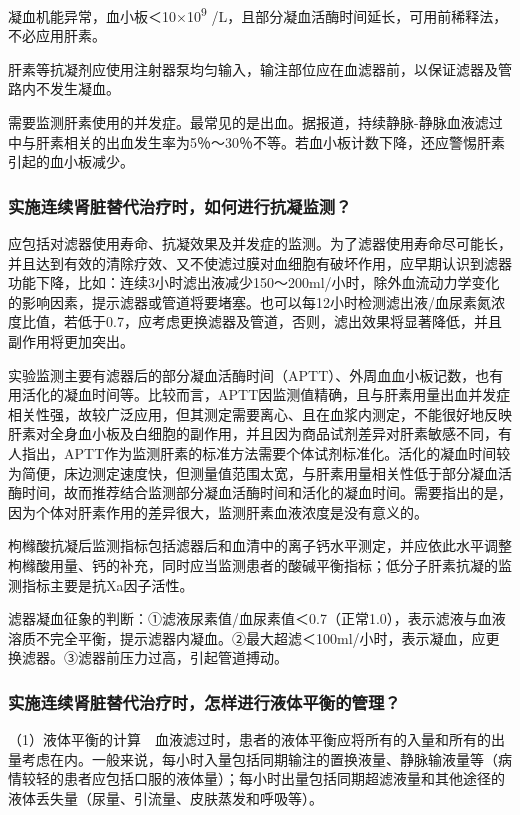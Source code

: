 凝血机能异常，血小板＜10×10\textsuperscript{9}
/L，且部分凝血活酶时间延长，可用前稀释法，不必应用肝素。

肝素等抗凝剂应使用注射器泵均匀输入，输注部位应在血滤器前，以保证滤器及管路内不发生凝血。

需要监测肝素使用的并发症。最常见的是出血。据报道，持续静脉-静脉血液滤过中与肝素相关的出血发生率为5％～30％不等。若血小板计数下降，还应警惕肝素引起的血小板减少。

\subsubsection{实施连续肾脏替代治疗时，如何进行抗凝监测？}

应包括对滤器使用寿命、抗凝效果及并发症的监测。为了滤器使用寿命尽可能长，并且达到有效的清除疗效、又不使滤过膜对血细胞有破坏作用，应早期认识到滤器功能下降，比如：连续3小时滤出液减少150～200ml/小时，除外血流动力学变化的影响因素，提示滤器或管道将要堵塞。也可以每12小时检测滤出液/血尿素氮浓度比值，若低于0.7，应考虑更换滤器及管道，否则，滤出效果将显著降低，并且副作用将更加突出。

实验监测主要有滤器后的部分凝血活酶时间（APTT）、外周血血小板记数，也有用活化的凝血时间等。比较而言，APTT因监测值精确，且与肝素用量出血并发症相关性强，故较广泛应用，但其测定需要离心、且在血浆内测定，不能很好地反映肝素对全身血小板及白细胞的副作用，并且因为商品试剂差异对肝素敏感不同，有人指出，APTT作为监测肝素的标准方法需要个体试剂标准化。活化的凝血时间较为简便，床边测定速度快，但测量值范围太宽，与肝素用量相关性低于部分凝血活酶时间，故而推荐结合监测部分凝血活酶时间和活化的凝血时间。需要指出的是，因为个体对肝素作用的差异很大，监测肝素血液浓度是没有意义的。

枸橼酸抗凝后监测指标包括滤器后和血清中的离子钙水平测定，并应依此水平调整枸橼酸用量、钙的补充，同时应当监测患者的酸碱平衡指标；低分子肝素抗凝的监测指标主要是抗Xa因子活性。

滤器凝血征象的判断：①滤液尿素值/血尿素值＜0.7（正常1.0），表示滤液与血液溶质不完全平衡，提示滤器内凝血。②最大超滤＜100ml/小时，表示凝血，应更换滤器。③滤器前压力过高，引起管道搏动。

\subsubsection{实施连续肾脏替代治疗时，怎样进行液体平衡的管理？}

（1）液体平衡的计算　血液滤过时，患者的液体平衡应将所有的入量和所有的出量考虑在内。一般来说，每小时入量包括同期输注的置换液量、静脉输液量等（病情较轻的患者应包括口服的液体量）；每小时出量包括同期超滤液量和其他途径的液体丢失量（尿量、引流量、皮肤蒸发和呼吸等）。

